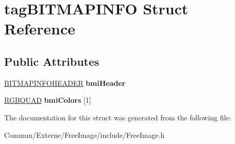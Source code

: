 \hypertarget{structtag_b_i_t_m_a_p_i_n_f_o}{}\section{tag\+B\+I\+T\+M\+A\+P\+I\+N\+FO Struct Reference}
\label{structtag_b_i_t_m_a_p_i_n_f_o}
\subsection*{Public Attributes}
\begin{DoxyCompactItemize}
\item 
\hyperlink{structtag_b_i_t_m_a_p_i_n_f_o_h_e_a_d_e_r}{B\+I\+T\+M\+A\+P\+I\+N\+F\+O\+H\+E\+A\+D\+ER} {\bfseries bmi\+Header}\hypertarget{structtag_b_i_t_m_a_p_i_n_f_o_a1cbcd562dccbedec498b504f247405c3}{}\label{structtag_b_i_t_m_a_p_i_n_f_o_a1cbcd562dccbedec498b504f247405c3}

\item 
\hyperlink{structtag_r_g_b_q_u_a_d}{R\+G\+B\+Q\+U\+AD} {\bfseries bmi\+Colors} \mbox{[}1\mbox{]}\hypertarget{structtag_b_i_t_m_a_p_i_n_f_o_a5a9747ecf91e36b60469f6483ec1980e}{}\label{structtag_b_i_t_m_a_p_i_n_f_o_a5a9747ecf91e36b60469f6483ec1980e}

\end{DoxyCompactItemize}


The documentation for this struct was generated from the following file\+:\begin{DoxyCompactItemize}
\item 
Commun/\+Externe/\+Free\+Image/include/Free\+Image.\+h\end{DoxyCompactItemize}
